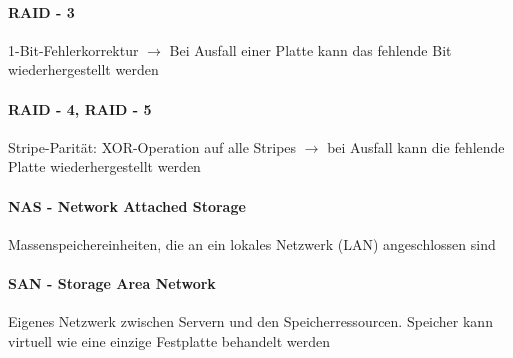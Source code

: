 \documentclass[11pt,a4paper,landscape]{article}
\begin{document}
\begin{multicols*}{3}
	\paragraph{RAID - 3} 1-Bit-Fehlerkorrektur $\rightarrow$ Bei Ausfall einer Platte kann das fehlende Bit wiederhergestellt werden
	\paragraph{RAID - 4, RAID - 5} Stripe-Parität: XOR-Operation auf alle Stripes $\rightarrow$ bei Ausfall kann die fehlende Platte wiederhergestellt werden
	\paragraph{NAS - Network Attached Storage} Massenspeichereinheiten, die an ein lokales Netzwerk (LAN) angeschlossen sind
	\paragraph{SAN - Storage Area Network} Eigenes Netzwerk zwischen Servern und den Speicherressourcen. Speicher kann virtuell wie eine einzige Festplatte behandelt werden
	\end{multicols*}
\end{document}
